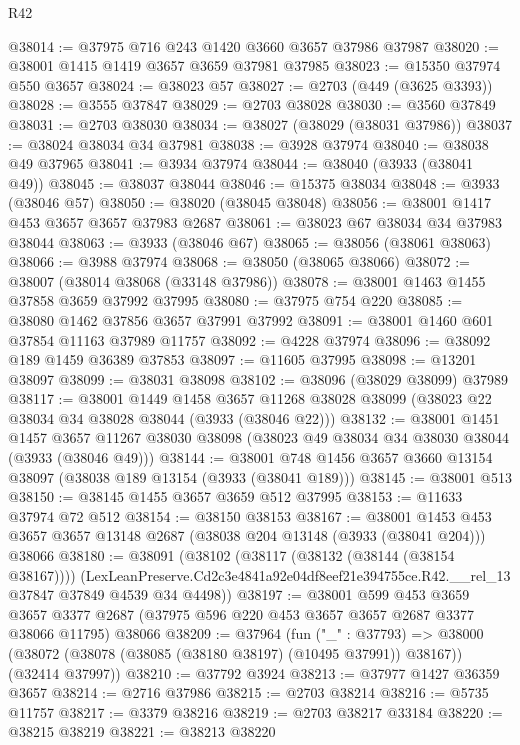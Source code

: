 \begin{lexlean}{R42}
\begin{coremodule}
@38014 := @37975 @716 @243 @1420 @3660 @3657 @37986 @37987
@38020 := @38001 @1415 @1419 @3657 @3659 @37981 @37985
@38023 := @15350 @37974 @550 @3657
@38024 := @38023 @57
@38027 := @2703 (@449 (@3625 @3393))
@38028 := @3555 @37847
@38029 := @2703 @38028
@38030 := @3560 @37849
@38031 := @2703 @38030
@38034 := @38027 (@38029 (@38031 @37986))
@38037 := @38024 @38034 @34 @37981
@38038 := @3928 @37974
@38040 := @38038 @49 @37965
@38041 := @3934 @37974
@38044 := @38040 (@3933 (@38041 @49))
@38045 := @38037 @38044
@38046 := @15375 @38034
@38048 := @3933 (@38046 @57)
@38050 := @38020 (@38045 @38048)
@38056 := @38001 @1417 @453 @3657 @3657 @37983 @2687
@38061 := @38023 @67 @38034 @34 @37983 @38044
@38063 := @3933 (@38046 @67)
@38065 := @38056 (@38061 @38063)
@38066 := @3988 @37974
@38068 := @38050 (@38065 @38066)
@38072 := @38007 (@38014 @38068 (@33148 @37986))
@38078 := @38001 @1463 @1455 @37858 @3659 @37992 @37995
@38080 := @37975 @754 @220
@38085 := @38080 @1462 @37856 @3657 @37991 @37992
@38091 := @38001 @1460 @601 @37854 @11163 @37989 @11757
@38092 := @4228 @37974
@38096 := @38092 @189 @1459 @36389 @37853
@38097 := @11605 @37995
@38098 := @13201 @38097
@38099 := @38031 @38098
@38102 := @38096 (@38029 @38099) @37989
@38117 := @38001
    @1449
    @1458
    @3657
    @11268
    @38028
    @38099
    (@38023 @22 @38034 @34 @38028 @38044 (@3933 (@38046 @22)))
@38132 := @38001
    @1451
    @1457
    @3657
    @11267
    @38030
    @38098
    (@38023 @49 @38034 @34 @38030 @38044 (@3933 (@38046 @49)))
@38144 := @38001 @748 @1456 @3657 @3660 @13154 @38097 (@38038 @189 @13154 (@3933 (@38041 @189)))
@38145 := @38001 @513
@38150 := @38145 @1455 @3657 @3659 @512 @37995
@38153 := @11633 @37974 @72 @512
@38154 := @38150 @38153
@38167 := @38001
    @1453
    @453
    @3657
    @3657
    @13148
    @2687
    (@38038 @204 @13148 (@3933 (@38041 @204)))
    @38066
@38180 := @38091
    (@38102
      (@38117 (@38132 (@38144 (@38154 @38167))))
      (LexLeanPreserve.Cd2c3e4841a92e04df8eef21e394755ce.R42.__rel_13
        @37847
        @37849
        @4539
        @34
        @4498))
@38197 := @38001
    @599
    @453
    @3659
    @3657
    @3377
    @2687
    (@37975 @596 @220 @453 @3657 @3657 @2687 @3377 @38066 @11795)
    @38066
@38209 := @37964
    (fun ("_" : @37793) =>
    @38000 (@38072 (@38078 (@38085 (@38180 @38197) (@10495 @37991)) @38167)) (@32414 @37997))
@38210 := @37792 @3924
@38213 := @37977 @1427 @36359 @3657
@38214 := @2716 @37986
@38215 := @2703 @38214
@38216 := @5735 @11757
@38217 := @3379 @38216
@38219 := @2703 @38217 @33184
@38220 := @38215 @38219
@38221 := @38213 @38220

\end{coremodule}
\end{lexlean}
